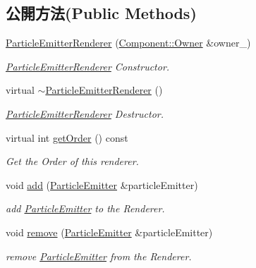 \subsection*{公開方法(Public Methods)}
\begin{DoxyCompactItemize}
\item 
\hyperlink{class_i_dream_sky_1_1_particle_emitter_renderer_a58ee2eabce19408a2020f905b4a771f4}{Particle\+Emitter\+Renderer} (\hyperlink{class_i_dream_sky_1_1_component_1_1_owner}{Component\+::\+Owner} \&owner\+\_\+)
\begin{DoxyCompactList}\small\item\em \hyperlink{class_i_dream_sky_1_1_particle_emitter_renderer}{Particle\+Emitter\+Renderer} Constructor. \end{DoxyCompactList}\item 
virtual \hyperlink{class_i_dream_sky_1_1_particle_emitter_renderer_a3c6a4130f20d9e875c6c024ef8adf980}{$\sim$\+Particle\+Emitter\+Renderer} ()
\begin{DoxyCompactList}\small\item\em \hyperlink{class_i_dream_sky_1_1_particle_emitter_renderer}{Particle\+Emitter\+Renderer} Destructor. \end{DoxyCompactList}\item 
virtual int \hyperlink{class_i_dream_sky_1_1_particle_emitter_renderer_a71deeeed3c70b5f468c57ae370858721}{get\+Order} () const 
\begin{DoxyCompactList}\small\item\em Get the Order of this renderer. \end{DoxyCompactList}\item 
void \hyperlink{class_i_dream_sky_1_1_particle_emitter_renderer_a808789c2c5439c8247590280d84508f5}{add} (\hyperlink{class_i_dream_sky_1_1_particle_emitter}{Particle\+Emitter} \&particle\+Emitter)
\begin{DoxyCompactList}\small\item\em add \hyperlink{class_i_dream_sky_1_1_particle_emitter}{Particle\+Emitter} to the Renderer. \end{DoxyCompactList}\item 
void \hyperlink{class_i_dream_sky_1_1_particle_emitter_renderer_a1c48314c5386716962d6859e4c546ef1}{remove} (\hyperlink{class_i_dream_sky_1_1_particle_emitter}{Particle\+Emitter} \&particle\+Emitter)
\begin{DoxyCompactList}\small\item\em remove \hyperlink{class_i_dream_sky_1_1_particle_emitter}{Particle\+Emitter} from the Renderer. \end{DoxyCompactList}\end{DoxyCompactItemize}
